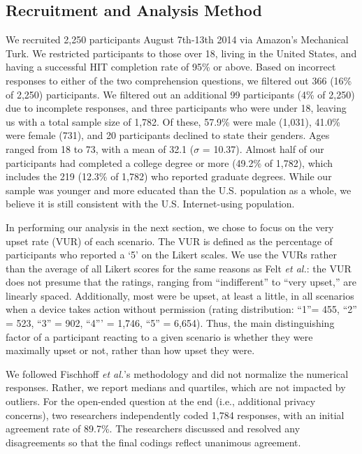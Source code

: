 \subsection{Recruitment and Analysis Method}
We recruited 2,250 participants August 7th-13th 2014 via Amazon's Mechanical Turk. We restricted participants to those over 18, living in the United States, and having a successful HIT completion rate of 95\% or above. Based on incorrect responses to either of the two comprehension questions, we filtered out 366 (16\% of 2,250) participants. We filtered out an additional 99 participants (4\% of 2,250) due to incomplete responses, and three participants who were under 18, leaving us with a total sample size of 1,782. Of these, 57.9\% were male (1,031), 41.0\% were female (731), and 20 participants declined to state their genders. Ages ranged from 18 to 73, with a mean of 32.1 ($\sigma$ = 10.37). Almost half of our participants had completed a college degree or more (49.2\% of 1,782), which includes the 219 (12.3\% of 1,782) who reported graduate degrees. While our sample was younger and more educated than the U.S. population as a whole, we believe it is still consistent with the U.S. Internet-using population.

In performing our analysis in the next section, we chose to focus on the very upset rate (VUR) of each scenario.  The VUR is defined as the percentage of participants who reported a `5' on the Likert scales. 
We use the VURs rather than the average of all Likert scores for the same reasons as Felt {\it et al.}: the VUR does not presume that the ratings, ranging from ``indifferent'' to ``very upset,'' are linearly spaced. Additionally, most were be upset, at least a little, in all scenarios when a device takes action without permission (rating distribution: ``1''= 455, ``2'' = 523, ``3'' = 902, ``4''' = 1,746, ``5'' = 6,654). Thus, the main distinguishing factor of a participant reacting to a given scenario is whether they were maximally upset or not, rather than how upset they were.

We followed Fischhoff {\it et al.}'s methodology and did not normalize the numerical responses. Rather, we report medians and quartiles, which are not impacted by outliers. For the open-ended question at the end (i.e., additional privacy concerns), two researchers independently coded 1,784 responses, with an initial agreement rate of 89.7\%. The researchers discussed and resolved any disagreements so that the final codings reflect unanimous agreement.